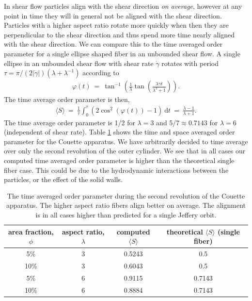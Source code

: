 \documentclass[preprint, 10pt]{elsarticle}
\begin{document}
In shear flow particles align with the shear direction
\emph{on average}, however at any point in time they will in general not
be aligned with the shear direction. Particles with a higher aspect
ratio rotate more quickly when then they are perpendicular to the shear
direction and thus spend more time nearly aligned with the shear
direction. We can compare this to the time averaged order parameter for
a single ellipse shaped fiber in an unbounded shear flow. A single
ellipse in an unbounded shear flow with shear rate $\dot{\gamma}$ rotates with
period $\tau = \pi/(2| \dot{\gamma}|)(\lambda + \lambda^{-1})$ \cite{Jeffery1922}
according to 
\begin{align*}
  \varphi(t) ~=~ \tan^{-1}\left(\frac{1}{\lambda}\tan\left(
    \frac{\lambda \dot{\gamma}t}{\lambda^2 + 1}\right)\right).
\end{align*}
The time average order parameter is then,
\begin{align*}
  \langle S\rangle ~=~ \frac{1}{\tau}\int_0^\tau\left( 
    2\cos^2(\varphi(t)) - 1\right)~\text{d}t ~=~ \frac{\lambda -1}{\lambda+1}.
\end{align*}
The time average order parameter is 1/2 for $\lambda= 3$ and 5/7$\approx 0.7143$ for $\lambda=6$
(independent of shear rate). Table \ref{tab:order} shows the time and space averaged order parameter
for the Couette apparatus. We have arbitrarily decided to time average over only the second
revolution of the outer cylinder. We see that in all cases our computed time averaged order
parameter is higher than the theoretical single fiber case. This could be due to the hydrodynamic
interactions between the particles, or the effect of the solid walls.

\begin{table}[!h]
\begin{center}
\begin{tabular}{c |c |c |c}
area fraction, $\phi$ & aspect ratio, $\lambda$ & computed $ \langle S \rangle$ & theoretical
$\langle S \rangle$ (single fiber)\\
\hline
5\% &3& 0.5243 & 0.5\\
10\% &3 & 0.6043 & 0.5\\
5\% & 6 & 0.9115 & 0.7143\\
10\% & 6 & 0.8884 & 0.7143
\end{tabular}
\end{center}
\caption{The time averaged order parameter during the second revolution of the Couette apparatus. The higher aspect ratio fibers align better on average. The alignment is in all cases higher than predicted for a single Jeffery orbit.
}\label{tab:order}
\end{table} 
\end{document}
